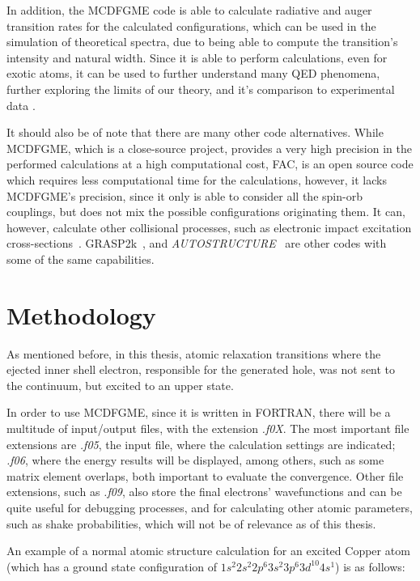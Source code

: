 In addition, the \gls{MCDFGME} code is able to calculate radiative and auger transition rates for the calculated configurations, which can be used in the simulation of theoretical spectra, due to being able to compute the transition's intensity and natural width.
Since it is able to perform calculations, even for exotic atoms, it can be used to further understand many QED phenomena, further exploring the limits of our theory, and it's comparison to experimental data \cite{Paul2021}.

It should also be of note that there are many other code alternatives. While \gls{MCDFGME}, which is a close-source project, provides a very high precision in the performed calculations at a high computational cost, \gls{FAC}, is an open source code which requires less computational time for the calculations, however, it lacks \gls{MCDFGME}'s precision, since it only is able to consider all the spin-orb couplings, but does not mix the possible configurations originating them. 
It can, however, calculate other collisional processes, such as electronic impact excitation cross-sections~\cite{FAC}. \gls{GRASP2k}~\cite{GRASP2K}, and \textit{AUTOSTRUCTURE}~\cite{AUTOSTRUCTURE} are other codes with some of the same capabilities.


\section{Methodology}

As mentioned before, in this thesis, atomic relaxation transitions where the ejected inner shell electron, responsible for the generated hole, was not sent to the continuum, but excited to an upper state.

In order to use \gls{MCDFGME}, since it is written in FORTRAN, there will be a multitude of input/output files, with the extension \textit{.f0X}. The most important file extensions are \textit{.f05}, the input file, where the calculation settings are indicated; \textit{.f06}, where the energy results will be displayed, among others, such as some matrix element overlaps, both important to evaluate the convergence.
 Other file extensions, such as \textit{.f09}, also store the final electrons' wavefunctions and can be quite useful for debugging processes, and for calculating other atomic parameters, such as shake probabilities, which will not be of relevance as of this thesis.

 An example of a normal atomic structure calculation for an excited Copper atom (which has a ground state configuration of $1s^2 2s^2 2p^6 3s^2 3p^6 3d^{10} 4s^1$) is as follows:

